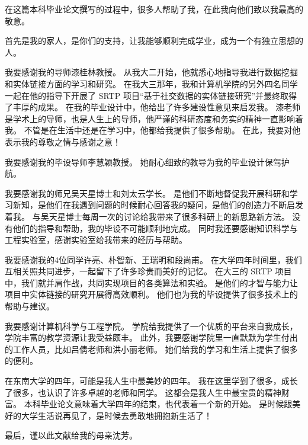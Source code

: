 \documentclass[bachelor, printoneside]{seuthesis} %
\begin{document}
\tableofcontents

% 

\begin{Main}








\end{Main}

\begin{Acknowledgement}
在这篇本科毕业论文撰写的过程中，很多人帮助了我，在此我向他们致以我最高的敬意。\par

首先是我的家人，是你们的支持，让我能够顺利完成学业，成为一个有独立思想的人。

我要感谢我的导师漆桂林教授。
从我大二开始，他就悉心地指导我进行数据挖掘和实体链接方面的学习和研究。
在我大三那年，我和计算机学院的另外四名同学一起在他的指导下开展了 SRTP 项目``基于社交数据的实体链接研究''并最终取得了丰厚的成果。
在我的毕业设计中，他给出了许多建设性意见来启发我。
漆老师是学术上的导师，也是人生上的导师，他严谨的科研态度和务实的精神一直影响着我。
不管是在生活中还是在学习中，他都给我提供了很多帮助。
在此，我要对他表示我的尊敬之情与感谢之意！\par

我要感谢我的毕设导师李慧颖教授。
她耐心细致的教导为我的毕业设计保驾护航。\par

我要感谢我的师兄吴天星博士和刘太云学长。
是他们不断地督促我开展科研和学习新知，是他们在我遇到问题的时候耐心回答我的疑问，是他们的创造力不断启发着我。
与吴天星博士每周一次的讨论给我带来了很多科研上的新思路新方法。
没有他们的指导和帮助，我的毕设不可能顺利地完成。
同时我还要感谢知识科学与工程实验室，感谢实验室给我带来的经历与帮助。\par

我要感谢我的4位同学许亮、朴智新、王瑞明和段尚甫。
在大学四年时间里，我们互相关照共同进步，一起留下了许多珍贵而美好的记忆。
在大三的 SRTP 项目中，我们就并肩作战，共同实现项目的各类算法和实验。
是他们的才智与能力让项目中实体链接的研究开展得高效顺利。
他们也为我的毕设提供了很多技术上的帮助与建议。\par

我要感谢计算机科学与工程学院。
学院给我提供了一个优质的平台来自我成长，学院丰富的教学资源让我受益颇丰。
此外，我要感谢学院里一直默默为学生付出的工作人员，比如吕倩老师和洪小丽老师。
她们给我的学习和生活上提供了很多的便利。\par

在东南大学的四年，可能是我人生中最美妙的四年。
我在这里学到了很多，成长了很多，也认识了许多卓越的老师和同学。
这都会是我人生中最宝贵的精神财富。
本科毕业论文意味着大学四年的结束，也代表着一个新的开始。
是时候跟美好的大学生活说再见了，是时候去勇敢地拥抱新生活了！\par

最后，谨以此文献给我的母亲沈芳。
\end{Acknowledgement}
\end{document}
